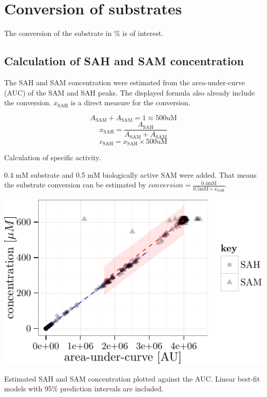 \documentclass[]{tufte-handout}
\begin{document}
\newpage

\section{Conversion of substrates}\label{conversion-of-substrates}

The conversion of the substrate in \% is of interest.

\subsection{Calculation of SAH and SAM
concentration}\label{calculation-of-sah-and-sam-concentration}

The SAH and SAM concentration were estimated from the area-under-curve
(AUC) of the SAM and SAH peaks. The displayed formula also already
include the conversion. \(x_\mathrm{SAH}\) is a direct measure for the
conversion.

\begin{marginfigure}
$$A_\mathrm{SAM} + A_\mathrm{SAM} = 1 \approx 500 \mathrm{uM}$$
$$x_\mathrm{SAH} = \frac{A_\mathrm{SAH}}{A_\mathrm{SAM} + A_\mathrm{SAM}}$$
$$c_\mathrm{SAH} = x_\mathrm{SAH} \times 500 \mathrm{uM}$$
\caption{Calculation of specific activity.}
\end{marginfigure}

0.4 mM substrate and 0.5 mM biologically active SAM were added. That
means the substrate conversion can be estimated by
\(conversion = \frac{0.4\mathrm{mM}}{0.5\mathrm{mM} \times x_\mathrm{SAH}}\).

\begin{marginfigure}
 \includegraphics{tufte_files/figure-latex/concentration_estimation-1.pdf}
\caption{Estimated SAH and SAM concentration plotted against the AUC. Linear best-fit models with 95\% prediction intervals are included.}
\end{marginfigure}
\end{document}
